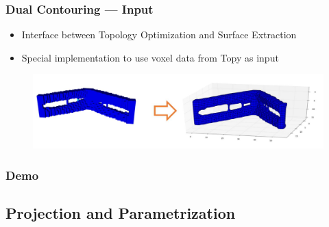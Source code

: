 \begin{frame}

	\frametitle{Dual Contouring --- Input}
	
	\begin{itemize}
	\item Interface between Topology Optimization and Surface Extraction
	\item Special implementation to use voxel data from Topy as input
	\end{itemize}
	\begin{figure}
	\includegraphics[scale=0.35]{Pictures/DC/cantilever.pdf}
	\end{figure}
	
\end{frame}

\begin{frame}

	\frametitle{Demo}
	

\end{frame}

\subsection{Projection and Parametrization}

